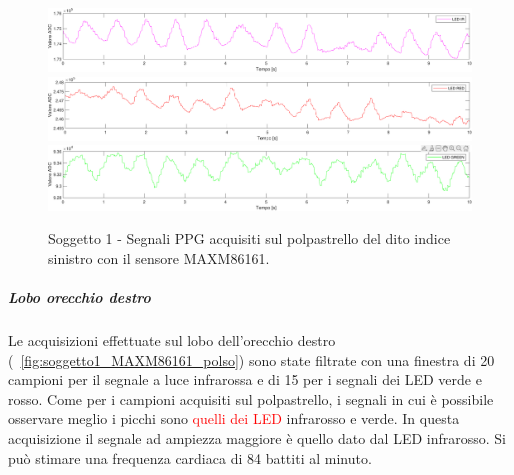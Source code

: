 \begin{figure}[h]
	\centering
	\includegraphics[width=1\linewidth]{ImageFiles/Misure Preliminari/Soggetto 1/MAXM86161/polpastrello_ired}
	\includegraphics[width=1\linewidth]{ImageFiles/Misure Preliminari/Soggetto 1/MAXM86161/polpastrello_red}
	\includegraphics[width=1\linewidth]{ImageFiles/Misure Preliminari/Soggetto 1/MAXM86161/polpastrello_green}
	\caption{Soggetto 1 - Segnali PPG acquisiti sul polpastrello del dito indice sinistro con il sensore MAXM86161.}
	\label{fig:soggetto1_MAXM86161_polpastrello}
\end{figure}

\clearpage

\subparagraph{Lobo orecchio destro}

Le acquisizioni effettuate sul lobo dell'orecchio destro (\Fig~\ref{fig:soggetto1_MAXM86161_polso}) sono state filtrate con una finestra di 20 campioni per il segnale a luce infrarossa e di 15 per i segnali dei LED verde e rosso. Come per i campioni acquisiti sul polpastrello, i segnali in cui è possibile osservare meglio i picchi sono \textcolor{red}{quelli dei LED} infrarosso e verde. In questa acquisizione il segnale ad ampiezza maggiore è quello dato dal LED infrarosso. Si può stimare una frequenza cardiaca di 84 battiti al minuto.

